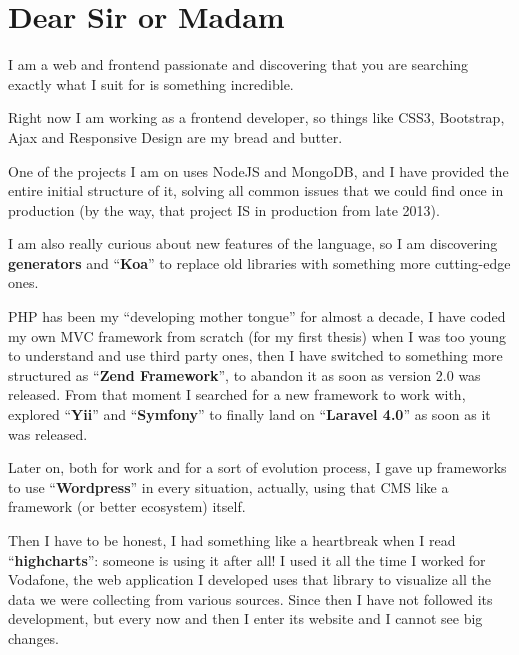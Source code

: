 \documentclass[letterpaper]{deedy-resume} %
\begin{document}
\begin{minipage}[t]{1\textwidth}


\section{Dear Sir or Madam}

I am a web and frontend passionate and discovering that you are searching exactly what I suit for is something incredible.

\vspace{5mm}

Right now I am working as a frontend developer, so things like CSS3, Bootstrap, Ajax and Responsive Design are my bread and butter.

One of the projects I am on uses NodeJS and MongoDB, and I have provided the entire initial structure of it, solving all common issues that we could find once in production (by the way, that project IS in production from late 2013). 

I am also really curious about new features of the language, so I am discovering \textbf{generators} and ``\textbf{Koa}'' to replace old libraries with something more cutting-edge ones.

\vspace{5mm}

PHP has been my ``developing mother tongue'' for almost a decade, I have coded my own MVC framework from scratch (for my first thesis) when I was too young to understand and use third party ones, then I have switched to something more structured as ``\textbf{Zend Framework}'', to abandon it as soon as version 2.0 was released. From that moment I searched for a new framework to work with, explored ``\textbf{Yii}'' and ``\textbf{Symfony}'' to finally land on ``\textbf{Laravel 4.0}'' as soon as it was released.

Later on, both for work and for a sort of evolution process, I gave up frameworks to use ``\textbf{Wordpress}'' in every situation, actually, using that CMS like a framework (or better ecosystem) itself.

\vspace{5mm}

Then I have to be honest, I had something like a heartbreak when I read ``\textbf{highcharts}'': someone is using it after all! I used it all the time I worked for Vodafone, the web application I developed uses that library to visualize all the data we were collecting from various sources. Since then I have not followed its development, but every now and then I enter its website and I cannot see big changes.


\end{minipage}
\end{document}
